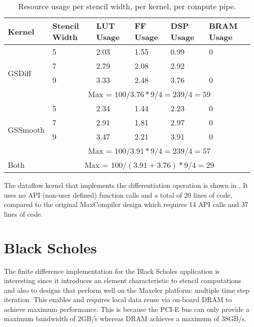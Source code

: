 \begin{table}[ht!]
  \begin{tabularx}{\textwidth}{X|X|X|X|X|X}
    Kernel                    & Stencil Width & LUT Usage & FF Usage & DSP Usage & BRAM Usage   \\
    \hline\hline
    \multirow{4}{*}{GSDiff}   & 5             & 2.03      & 1.55     & 0.99      & 0            \\
    & 7             & 2.79      & 2.08     & 2.92      &              \\
    & 9             & 3.33      & 2.48     & 3.76      & 0            \\
    \cline{2-6}
    & \multicolumn{5}{c}{Max = $100 / 3.76 * 9 / 4 = 239 / 4 = 59 $} \\
    \hline
    \multirow{4}{*}{GSSmooth} & 5             & 2.34      & 1.44     & 2.23      & 0            \\
    & 7             & 2.91      & 1.81     & 2.97      & 0            \\
    & 9             & 3.47      & 2.21     & 3.91      & 0            \\
    \cline{2-6}
    & \multicolumn{5}{c}{Max = $100 / 3.91 * 9 / 4 = 239 / 4 = 57 $} \\
    \hline
    Both                       & \multicolumn{5}{c}{Max = $100 / (3.91 + 3.76) * 9 / 4 = 29 $}  \\
  \end{tabularx}
  \caption{Resource usage per stencil width, per kernel, per compute pipe.}
  \label{table:nd2}
\end{table}


The \FAST{} dataflow kernel that implements the differentiation
operation is shown in . It uses no API (non-user
defined) function calls and a total of 20 lines of code, compared to
the original MaxCompiler design which requires 14 API calls and 37
lines of code.

 \section{Black Scholes}

 The finite difference implementation for the Black Scholes
 application is interesting since it introduces an element
 characteristic to stencil computations and also to designs that
 perform well on the Maxeler platform: multiple time step
 iteration. This enables and requires local data reuse via on-board
 DRAM to achieve maximum performance. This is because the PCI-E bus
 can only provide a maximum bandwidth of 2GB/s whereas DRAM achieves a
 maximum of 38GB/s.

